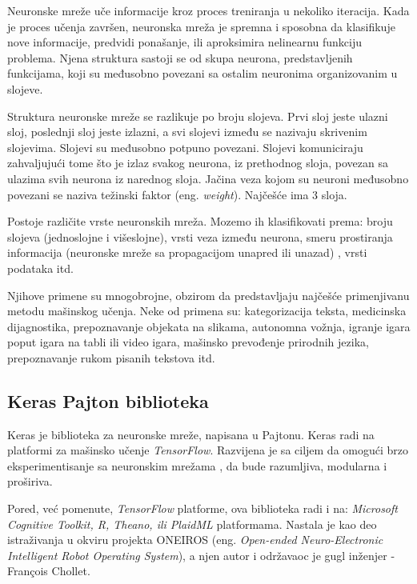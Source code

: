 \documentclass[a4paper]{article}
\begin{document}
Neuronske mreže uče informacije kroz proces treniranja u nekoliko iteracija. Kada je proces učenja završen, 
neuronska mreža je spremna i sposobna da klasifikuje nove informacije, predvidi ponašanje, ili aproksimira nelinearnu funkciju problema. 
Njena struktura sastoji se od skupa neurona, predstavljenih
funkcijama, koji su međusobno povezani sa ostalim neuronima organizovanim u slojeve. 

Struktura neuronske mreže se razlikuje po broju slojeva. Prvi sloj jeste ulazni sloj, poslednji sloj jeste izlazni, a svi slojevi između se nazivaju skrivenim
slojevima. Slojevi su međusobno potpuno povezani. Slojevi komuniciraju zahvaljujući tome što je izlaz svakog neurona, iz prethodnog sloja, povezan sa
ulazima svih neurona iz narednog sloja. Jačina veza kojom su neuroni međusobno povezani se naziva težinski faktor (eng. \emph{weight}). Najčešće ima
3 sloja.

Postoje različite vrste neuronskih mreža. Mozemo ih klasifikovati prema: broju slojeva (jednoslojne i višeslojne), vrsti veza između neurona, smeru
prostiranja informacija (neuronske mreže sa propagacijom unapred ili unazad) \cite{website}, vrsti podataka itd. 

Njihove primene su mnogobrojne, obzirom da predstavljaju najčešće primenjivanu metodu mašinskog učenja. Neke od primena su: kategorizacija teksta,
medicinska dijagnostika, prepoznavanje objekata na slikama, autonomna vožnja, igranje igara poput igara na tabli ili video igara, mašinsko prevođenje
prirodnih jezika, prepoznavanje rukom pisanih tekstova itd. 

\subsection{Keras Pajton biblioteka}
\label{subsec:keras}

Keras je biblioteka za neuronske mreže, napisana u Pajtonu. Keras radi na platformi za mašinsko učenje  \textit{TensorFlow}.
Razvijena je sa ciljem da omogući brzo eksperimentisanje sa neuronskim mrežama \cite{keraswebsite},
da bude razumljiva, modularna i proširiva.

Pored, već pomenute, \textit{TensorFlow} platforme, ova biblioteka radi i na: \textit{Microsoft Cognitive Toolkit, R, Theano, ili PlaidML} platformama. 
Nastala je kao deo istraživanja u okviru projekta ONEIROS (eng. \emph{Open-ended Neuro-Electronic Intelligent Robot Operating System}), 
a njen autor i održavaoc je gugl inženjer -  François Chollet.
\end{document}
